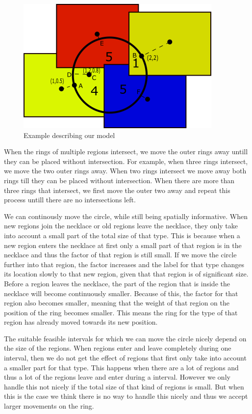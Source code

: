 \documentclass[a4paper,11pt]{article}
\begin{document}
\begin{figure}[H]
	\centering
	\includegraphics{figure1.png}
	\caption{Example describing our model}
	\label{fig:example}
\end{figure}

When the rings of multiple regions intersect, we move the outer rings away untill they can be placed without intersection.
For example, when three rings intersect, we move the two outer rings away.
When two rings intersect we move away both rings till they can be placed without intersection. 
When there are more than three rings that intersect, we first move the outer two away and repeat this process untill there are no intersections left.

We can continously move the circle, while still being spatially informative. 
When new regions join the necklace or old regions leave the necklace, they only take into account a small part of the total size of that type. 
This is because when a new region enters the necklace at first only a small part of that region is in the necklace and thus the factor of that region is still small. 
If we move the circle further into that region, the factor increases and the label for that type changes its location slowly to that new region, given that that region is of significant size.
Before a region leaves the necklace, the part of the region that is inside the necklace will become continuously smaller.
Because of this, the factor for that region also becomes smaller, meaning that the weight of that region on the position of the ring becomes smaller.
This means the ring for the type of that region has already moved towards its new position.

The suitable feasible intervals for which we can move the circle nicely depend on the size of the regions. 
When regions enter and leave completely during one interval, then we do not get the effect of regions that first only take into account a smaller part for that type. 
This happens when there are a lot of regions and thus a lot of the regions leave and enter during a interval. 
However we only handle this not  nicely if the total size of that kind of regions is small. 
But when this is the case we think there is no way to handle this nicely and thus we accept larger movements on the ring. 
\end{document}

